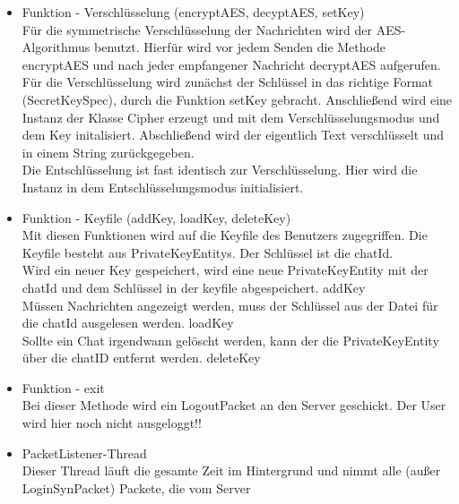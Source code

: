 \begin{itemize}
    
    \item Funktion - Verschlüsselung (encryptAES, decyptAES, setKey) \\
    Für die symmetrische Verschlüsselung der Nachrichten wird der AES-Algorithmus benutzt. Hierfür wird vor jedem Senden
    die Methode encryptAES und nach jeder empfangener Nachricht decryptAES aufgerufen.\\
    Für die Verschlüsselung wird zunächst der Schlüssel in das richtige Format (SecretKeySpec), durch die Funktion
    setKey gebracht. Anschließend wird eine Instanz der Klasse Cipher erzeugt und mit dem Verschlüsselungsmodus und
    dem Key initalisiert. Abschließend wird der eigentlich Text verschlüsselt und in einem String zurückgegeben. \\
    Die Entschlüsselung ist fast identisch zur Verschlüsselung. Hier wird die Instanz in dem Entschlüsselungsmodus
    initialisiert.
    
    \item Funktion - Keyfile (addKey, loadKey, deleteKey) \\
    Mit diesen Funktionen wird auf die Keyfile des Benutzers zugegriffen. Die Keyfile besteht aus PrivateKeyEntitys.
    Der Schlüssel ist die chatId. \\
    Wird ein neuer Key gespeichert, wird eine neue PrivateKeyEntity mit der chatId und dem Schlüssel in der keyfile
    abgespeichert. addKey\\
    Müssen Nachrichten angezeigt werden, muss der Schlüssel aus der Datei für die chatId ausgelesen werden. loadKey \\
    Sollte ein Chat irgendwann gelöscht werden, kann der die PrivateKeyEntity über die chatID entfernt werden. deleteKey\\
    
    \item Funktion - exit \\
    Bei dieser Methode wird ein LogoutPacket an den Server geschickt. Der User wird hier noch nicht ausgeloggt!!
    
    \item PacketListener-Thread \\
    Dieser Thread läuft die gesamte Zeit im Hintergrund und nimmt alle (außer LoginSynPacket) Packete, die vom Server

\end{itemize}
